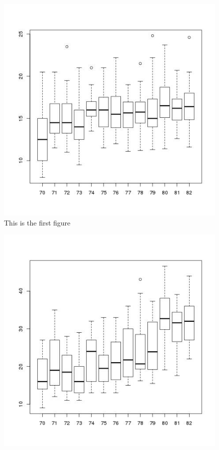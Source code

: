 \documentclass[letter,10pt]{article}
\begin{document}
    \begin{minipage}{\linewidth}
      \centering
      \begin{minipage}{0.45\linewidth}
          \begin{figure}[H]
              \includegraphics[width=\linewidth]{bp_acceleration_year.jpg}
              \caption{This is the first figure}
          \end{figure}
      \end{minipage}
      \hspace{0.05\linewidth}
      \begin{minipage}{0.45\linewidth}
          \begin{figure}[H]
              \includegraphics[width=\linewidth]{bp_mpg_year.jpg}

\end{figure}
\end{minipage}
\end{minipage}
\end{document}
